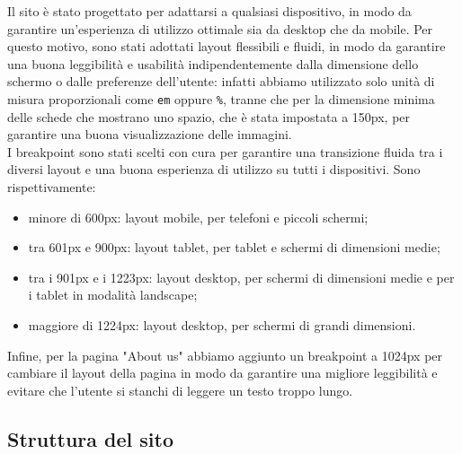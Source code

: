Il sito è stato progettato per adattarsi a qualsiasi dispositivo, in modo da
garantire un'esperienza di utilizzo ottimale sia da desktop che da mobile. Per
questo motivo, sono stati adottati layout flessibili e fluidi, in modo da
garantire una buona leggibilità e usabilità indipendentemente dalla dimensione
dello schermo o dalle preferenze dell'utente: infatti abbiamo utilizzato solo
unità di misura proporzionali come \texttt{em} oppure \texttt{\%}, tranne che
per la dimensione minima delle schede che mostrano uno spazio, che è stata
impostata a 150px, per garantire una buona visualizzazione delle immagini.\\
I breakpoint sono stati scelti
con cura per garantire una transizione fluida tra i diversi layout e una
buona esperienza di utilizzo su tutti i dispositivi. Sono rispettivamente:
\begin{itemize}
	\item minore di 600px: layout mobile, per telefoni e piccoli schermi;

	\item tra 601px e 900px: layout tablet, per tablet e schermi di dimensioni
	      medie;

	\item tra i 901px e i 1223px: layout desktop, per schermi di dimensioni
	      medie e per i tablet in modalità landscape;

	\item maggiore di 1224px: layout desktop, per schermi di grandi dimensioni.
\end{itemize}

Infine, per la pagina "About us" abbiamo aggiunto un breakpoint a 1024px per
cambiare il layout della pagina in modo da garantire una migliore leggibilità
e evitare che l'utente si stanchi di leggere un testo troppo lungo.

\subsection{Struttura del sito}

